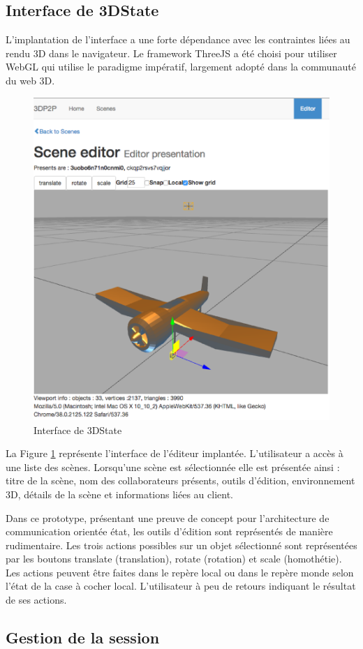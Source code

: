 \subsection{Interface de 3DState}
L'implantation de l'interface a une forte dépendance avec les contraintes liées au 
rendu 3D dans le navigateur. Le framework ThreeJS a été choisi pour utiliser 
WebGL qui utilise le paradigme impératif, largement adopté dans la communauté 
du web 3D.

\begin{figure}[h]
	\centering
	\includegraphics[width=0.5\columnwidth]{eps/editorpresentation.eps}
	\caption{Interface de 3DState}
	\label{fig:3Dstateinterface}
\end{figure}

La Figure \ref{fig:3Dstateinterface} représente l'interface de l'éditeur implantée. 
L'utilisateur a accès à une liste des scènes. Lorsqu'une scène est sélectionnée 
elle 
est présentée ainsi : titre de la scène, nom des collaborateurs présents, outils 
d'édition, environnement 3D, détails de la scène et informations liées au client.


Dans ce prototype, présentant une preuve de concept pour l'architecture de 
communication orientée état, les outils d'édition sont représentés de manière 
rudimentaire. Les trois actions possibles sur un objet sélectionné sont 
représentées par les boutons \og translate\fg{} (translation), \og rotate\fg{} 
(rotation) et \og scale\fg{} (homothétie). Les actions peuvent être faites dans le 
repère \og local\fg{} ou dans le repère \og monde\fg{} selon l'état de la case à 
cocher \og local\fg{}. L'utilisateur à peu de retours indiquant le résultat de ses 
actions.



\subsection{Gestion de la session}


